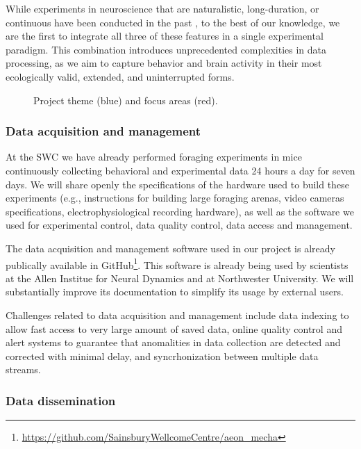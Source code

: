 While experiments in neuroscience that are naturalistic, long-duration, or
continuous have been conducted in the past
\citep[e.g.,][]{jhuangEtAl10,maoEtAl21,volohEtAl23}, to the best of our
knowledge, we are the first to integrate all three of these features in a
single experimental paradigm.
%
This combination introduces unprecedented complexities in data processing, as
we aim to capture behavior and brain activity in their most ecologically valid,
extended, and uninterrupted forms.

\begin{figure}
    \begin{center}
        \resizebox{4.0in}{!}{%
            
        }
    \end{center}
    \caption{Project theme (blue) and focus areas (red).}
    \label{fig:focusAreas}
\end{figure}

\subsubsection{Data acquisition and management}

At the SWC we have already performed foraging experiments in mice continuously collecting
behavioral and experimental data 24 hours a day for seven days.
%
We will share openly the specifications of the hardware used to build these
experiments (e.g., instructions for building large foraging arenas, video
cameras specifications, electrophysiological recording hardware), as well as
the software we used for experimental control, data quality control, data
access and management.

The data acquisition and management software used in our project is already
publically available in
GitHub\footnote{\url{https://github.com/SainsburyWellcomeCentre/aeon\_mecha}}.
%
This software is already being used by scientists at the Allen Institue for
Neural Dynamics and at Northwester University.
%
We will substantially improve its documentation to simplify its usage by
external users.

Challenges related to data acquisition and management include data indexing to
allow fast access to very large amount of saved data, online quality control
and alert systems to guarantee that anomalities in data collection are detected
and corrected with minimal delay, and syncrhonization between multiple data
streams.

\subsubsection{Data dissemination}

